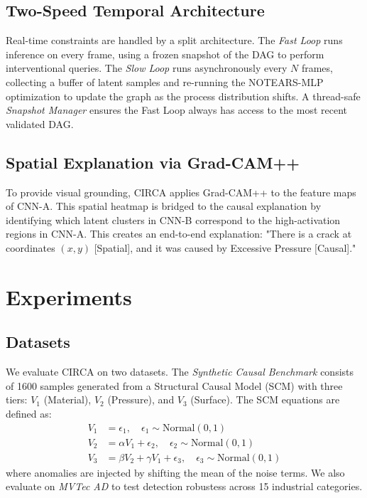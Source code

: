 \documentclass{article}
\begin{document}
\subsection{Two-Speed Temporal Architecture}
Real-time constraints are handled by a split architecture. The \emph{Fast Loop} runs inference on every frame, using a frozen snapshot of the DAG to perform interventional queries. The \emph{Slow Loop} runs asynchronously every $N$ frames, collecting a buffer of latent samples and re-running the NOTEARS-MLP optimization to update the graph as the process distribution shifts. A thread-safe \emph{Snapshot Manager} ensures the Fast Loop always has access to the most recent validated DAG.

\subsection{Spatial Explanation via Grad-CAM++}
To provide visual grounding, CIRCA applies Grad-CAM++ to the feature maps of CNN-A. This spatial heatmap is bridged to the causal explanation by identifying which latent clusters in CNN-B correspond to the high-activation regions in CNN-A. This creates an end-to-end explanation: "There is a crack at coordinates $(x,y)$ [Spatial], and it was caused by Excessive Pressure [Causal]."

\section{Experiments}

\subsection{Datasets}
We evaluate CIRCA on two datasets. The \emph{Synthetic Causal Benchmark} consists of 1600 samples generated from a Structural Causal Model (SCM) with three tiers: $V_1$ (Material), $V_2$ (Pressure), and $V_3$ (Surface). The SCM equations are defined as:
\begin{align}
    V_1 &= \epsilon_1, \quad \epsilon_1 \sim \text{Normal}(0, 1) \\
    V_2 &= \alpha V_1 + \epsilon_2, \quad \epsilon_2 \sim \text{Normal}(0, 1) \\
    V_3 &= \beta V_2 + \gamma V_1 + \epsilon_3, \quad \epsilon_3 \sim \text{Normal}(0, 1)
\end{align}
where anomalies are injected by shifting the mean of the noise terms. We also evaluate on \emph{MVTec AD} to test detection robustess across 15 industrial categories.
\end{document}
